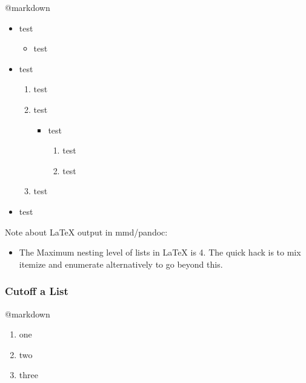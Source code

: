 \documentclass[]{article}
\providecommand{\tightlist}{%
  \setlength{\itemsep}{0pt}\setlength{\parskip}{0pt}}
\begin{document}
@markdown

\begin{itemize}
\tightlist
\item
  test

  \begin{itemize}
  \tightlist
  \item
    test
  \end{itemize}
\item
  test

  \begin{enumerate}
  \def\labelenumi{\arabic{enumi}.}
  \tightlist
  \item
    test
  \item
    test

    \begin{itemize}
    \tightlist
    \item
      test

      \begin{enumerate}
      \def\labelenumii{\arabic{enumii}.}
      \tightlist
      \item
        test
      \item
        test
      \end{enumerate}
    \end{itemize}
  \item
    test
  \end{enumerate}
\item
  test
\end{itemize}

Note about LaTeX output in mmd/pandoc:

\begin{itemize}
\tightlist
\item
  The Maximum nesting level of lists in LaTeX is 4. The quick hack is to
  mix itemize and enumerate alternatively to go beyond this.
\end{itemize}

\subsubsection{Cutoff a List}\label{cutoff-a-list}

@markdown

\begin{enumerate}
\def\labelenumi{\arabic{enumi}.}
\tightlist
\item
  one
\item
  two
\item
  three
\end{enumerate}
\end{document}
